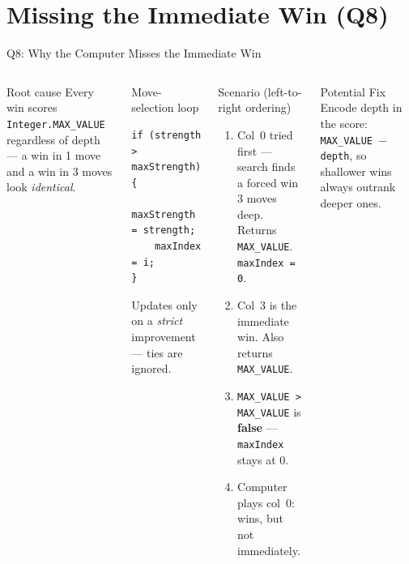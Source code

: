 \documentclass[aspectratio=1610]{beamer}
\begin{document}
\section{Missing the Immediate Win (Q8)}

\begin{frame}[fragile]{Q8: Why the Computer Misses the Immediate Win}
  \begin{columns}[T]
      \begin{alertblock}{Root cause}
        \footnotesize Every win scores \texttt{Integer.MAX\_VALUE} regardless of depth — a win in 1 move and a win in 3 moves look \emph{identical}.
      \end{alertblock}
      \begin{block}{Move-selection loop}
        \begin{lstlisting}
if (strength > maxStrength) {
    maxStrength = strength;
    maxIndex = i;
}
        \end{lstlisting}
        \footnotesize Updates only on a \emph{strict} improvement — ties are ignored.
      \end{block}
      \begin{block}{Scenario (left-to-right ordering)}
        \begin{enumerate}\footnotesize
          \item Col~0 tried first — search finds a forced win 3 moves deep. Returns \texttt{MAX\_VALUE}. \texttt{maxIndex = 0}.
          \item Col~3 is the immediate win. Also returns \texttt{MAX\_VALUE}.
          \item \texttt{MAX\_VALUE > MAX\_VALUE} is \textbf{false} — \texttt{maxIndex} stays at 0.
          \item Computer plays col~0: wins, but not immediately.
        \end{enumerate}
      \end{block}
      \begin{exampleblock}{Potential Fix}
        \footnotesize Encode depth in the score: \texttt{MAX\_VALUE\,$-$\,depth}, so shallower wins always outrank deeper ones.
      \end{exampleblock}
  \end{columns}
\end{frame}

\end{document}
